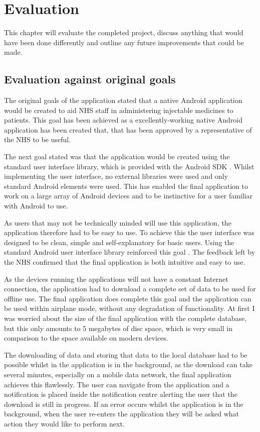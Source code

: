 \chapter{Evaluation}

This chapter will evaluate the completed project, discuss anything that would have been done differently and outline any future improvements that could be made. 

\section{Evaluation against original goals}

The original goals of the application stated that a native Android application would be created to aid NHS staff in administering injectable medicines to patients. This goal has been achieved as a excellently-working native Android application has been created that, that has been approved by a representative of the NHS to be useful. 

The next goal stated was that the application would be created using the standard user interface library, which is provided with the Android SDK \cite{android_sdk}. Whilst implementing the user interface, no external libraries were used and only standard Android elements were used. This has enabled the final application to work on a large array of Android devices and to be instinctive for a user familiar with Android to use.

As users that may not be technically minded will use this application, the application therefore had to be easy to use. To achieve this the user interface was designed to be clean, simple and self-explanatory for basic users. Using the standard Android user interface library reinforced this goal \cite{android_design}. The feedback left by the NHS confirmed that the final application is both intuitive and easy to use.

As the devices running the applications will not have a constant Internet connection, the application had to download a complete set of data to be used for offline use. The final application does complete this goal and the application can be used within airplane mode, without any degradation of functionality. At first I was worried about the size of the final application with the complete database, but this only amounts to 5 megabytes of disc space, which is very small in comparison to the space available on modern devices. 

The downloading of data and storing that data to the local database had to be possible whilst in the application is in the background, as the download can take several minutes, especially on a mobile data network, the final application achieves this flawlessly. The user can navigate from the application and a notification is placed inside the notification centre alerting the user that the download is still in progress. If an error occurs whilst the application is in the background, when the user re-enters the application they will be asked what action they would like to perform next. 

